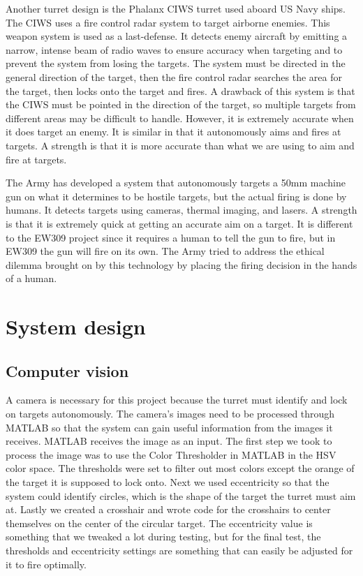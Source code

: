 \documentclass{article}
\begin{document}
Another turret design is the Phalanx CIWS turret used aboard US Navy ships. The CIWS uses a fire control radar system to target airborne enemies. This weapon system is used as a last-defense. It detects enemy aircraft by emitting a narrow, intense beam of radio waves to ensure accuracy when targeting and to prevent the system from losing the targets. The system must be directed in the general direction of the target, then the fire control radar searches the area for the target, then locks onto the target and fires. A drawback of this system is that the CIWS must be pointed in the direction of the target, so multiple targets from different areas may be difficult to handle. However, it is extremely accurate when it does target an enemy. It is similar in that it autonomously aims and fires at targets. A strength is that it is more accurate than what we are using to aim and fire at targets.

The Army has developed a system that autonomously targets a 50mm machine gun on what it determines to be hostile targets, but the actual firing is done by humans. It detects targets using cameras, thermal imaging, and lasers. A strength is that it is extremely quick at getting an accurate aim on a target. It is different to the EW309 project since it requires a human to tell the gun to fire, but in EW309 the gun will fire on its own. The Army tried to address the ethical dilemma brought on by this technology by placing the firing decision in the hands of a human.





\section{System design}

\subsection{Computer vision}
A camera is necessary for this project because the turret must identify and lock on targets autonomously. The camera’s images need to be processed through MATLAB so that the system can gain useful information from the images it receives. MATLAB receives the image as an input. The first step we took to process the image was to use the Color Thresholder in MATLAB in the HSV color space. The thresholds were set to filter out most colors except the orange of the target it is supposed to lock onto. Next we used eccentricity so that the system could identify circles, which is the shape of the target the turret must aim at. Lastly we created a crosshair and wrote code for the crosshairs to center themselves on the center of the circular target. The eccentricity value is something that we tweaked a lot during testing, but for the final test, the thresholds and eccentricity settings are something that can easily be adjusted for it to fire optimally. 
\end{document}
